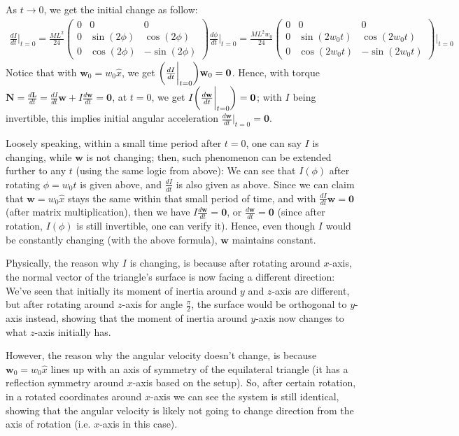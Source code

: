 \documentclass{article}
\DeclarePairedDelimiter{\paran}{(}{)}%
\newcommand{\bL}{\textbf{L}} %
\newcommand{\bN}{\textbf{N}} %
\newcommand{\bw}{\textbf{w}} %
\newcommand{\bzero}{\textbf{0}}
\begin{document}
As $t\rightarrow 0$, we get the initial change as follow:
\begin{align}
    \frac{dI}{dt}\bigg|_{t=0} = \frac{ML^2}{24}\begin{pmatrix}
        0&0&0\\
        0&\sin(2\phi)&\cos(2\phi)\\
        0 & \cos(2\phi) & -\sin(2\phi)
    \end{pmatrix}\frac{d\phi}{dt}\bigg|_{t=0} = \frac{ML^2w_0}{24}\begin{pmatrix}
        0&0&0\\
        0&\sin(2w_0t)&\cos(2w_0t)\\
        0 & \cos(2w_0t) & -\sin(2w_0t)
    \end{pmatrix}\bigg|_{t=0}
\end{align}
Notice that with $\bw_0 = w_0\hat{x}$, we get $\paran*{\frac{dI}{dt}\bigg|_{t=0}}\bw_0 = \bzero$. Hence, with torque $\bN=\frac{d\bL}{dt} = \frac{dI}{dt}\bw + I\frac{d\bw}{dt}=\bzero$, at $t=0$, we get $I\paran*{\frac{d\bw}{dt}\bigg|_{t=0}} = \bzero$; with $I$ being invertible, this implies initial angular acceleration $\frac{d\bw}{dt}\bigg|_{t=0}=\bzero$.

Loosely speaking, within a small time period after $t=0$, one can say $I$ is changing, while $\bw$ is not changing; then, such phenomenon can be extended further to any $t$ (using the same logic from above): We can see that $I(\phi)$ after rotating $\phi = w_0t$ is given above, and $\frac{dI}{dt}$ is also given as above. Since we can claim that $\bw=w_0\hat{x}$ stays the same within that small period of time, and with $\frac{dI}{dt}\bw = \bzero$ (after matrix multiplication), then we have $I\frac{d\bw}{dt}=\bzero$, or $\frac{d\bw}{dt}=\bzero$ (since after rotation, $I(\phi)$ is still invertible, one can verify it). Hence, even though $I$ would be constantly changing (with the above formula), $\bw$ maintains constant.

\hfil

Physically, the reason why $I$ is changing, is because after rotating around $x$-axis, the normal vector of the triangle's surface is now facing a different direction: We've seen that initially its moment of inertia around $y$ and $z$-axis are different, but after rotating around $z$-axis for angle $\frac{\pi}{2}$, the surface would be orthogonal to $y$-axis instead, showing that the moment of inertia around $y$-axis now changes to what $z$-axis initially has.

However, the reason why the angular velocity doesn't change, is because $\bw_0 = w_0\hat{x}$ lines up with an axis of symmetry of the equilateral triangle (it has a reflection symmetry around $x$-axis based on the setup). So, after certain rotation, in a rotated coordinates around $x$-axis we can see the system is still identical, showing that the angular velocity is likely not going to change direction from the axis of rotation (i.e. $x$-axis in this case).
\end{document}
